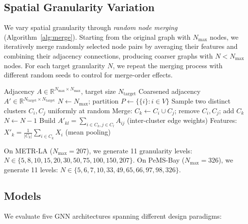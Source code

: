 \documentclass[letterpaper]{article}
\begin{document}
\subsection{Spatial Granularity Variation}

We vary spatial granularity through \textit{random node merging} (Algorithm~\ref{alg:merge}). Starting from the original graph with $N_\text{max}$ nodes, we iteratively merge randomly selected node pairs by averaging their features and combining their adjacency connections, producing coarser graphs with $N < N_\text{max}$ nodes. For each target granularity $N$, we repeat the merging process with different random seeds to control for merge-order effects.

\begin{algorithm}[t]
\caption{Random Node Merging}
\label{alg:merge}
\begin{algorithmic}[1]
\REQUIRE Adjacency $A \in \mathbb{R}^{N_\text{max} \times N_\text{max}}$, target size $N_\text{target}$
\ENSURE Coarsened adjacency $A' \in \mathbb{R}^{N_\text{target} \times N_\text{target}}$
\STATE $N \leftarrow N_\text{max}$; \quad partition $P \leftarrow \{\{i\} : i \in V\}$
    \STATE Sample two distinct clusters $C_i, C_j$ uniformly at random
    \STATE Merge: $C_k \leftarrow C_i \cup C_j$; \quad remove $C_i, C_j$; \quad add $C_k$
    \STATE $N \leftarrow N - 1$
\ENDWHILE
\STATE Build $A'_{kl} = \sum_{i \in C_k, j \in C_l} A_{ij}$ (inter-cluster edge weights)
\STATE Features: $X'_k = \frac{1}{|C_k|}\sum_{i \in C_k} X_i$ (mean pooling)
\end{algorithmic}
\end{algorithm}

On METR-LA ($N_\text{max} = 207$), we generate 11 granularity levels: $N \in \{5, 8, 10, 15, 20, 30, 50, 75, 100, 150, 207\}$. On PeMS-Bay ($N_\text{max} = 326$), we generate 11 levels: $N \in \{5, 6, 7, 10, 33, 49, 65, 66, 97, 98, 326\}$.

\subsection{Models}
\label{sec:models}

We evaluate five GNN architectures spanning different design paradigms:
\end{document}
